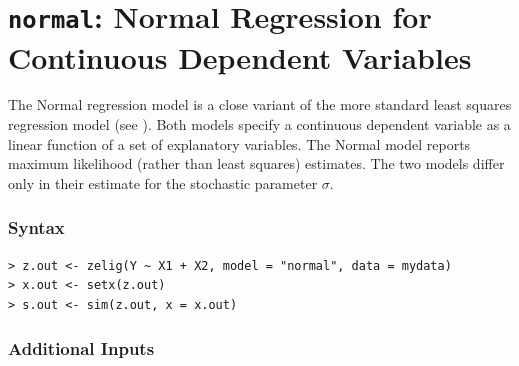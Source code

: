 

\usepackage{Sweave}

\nobibliography*

\section{{\tt normal}: Normal Regression for Continuous Dependent Variables}
\label{normal}

The Normal regression model is a close variant of the more standard
least squares regression model (see ). Both models specify a
continuous dependent variable as a linear function of a set of
explanatory variables.  The Normal model reports maximum likelihood
(rather than least squares) estimates.  The two models differ only in
their estimate for the stochastic parameter $\sigma$.

\subsubsection{Syntax}

\begin{verbatim}
> z.out <- zelig(Y ~ X1 + X2, model = "normal", data = mydata)
> x.out <- setx(z.out)
> s.out <- sim(z.out, x = x.out)
\end{verbatim}

\subsubsection{Additional Inputs} 

